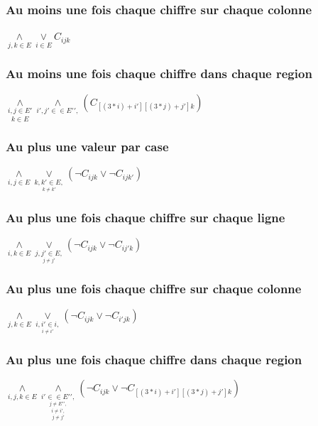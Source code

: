 \documentclass[12pt]{report}
\begin{document}
\subsubsection*{Au moins une fois chaque chiffre sur chaque colonne}
$\underset{j,k \in E}{\land} \underset{i \in E}{\lor} C_{ijk}$
\subsubsection*{Au moins une fois chaque chiffre dans chaque region}
$\underset{k \in E}{\underset{i,j \in E\prime}{\land}} \underset{i\prime,j\prime \in \in E\prime\prime,}{\land} (C_{[(3*i)+i\prime] [(3*j)+j\prime]k})$
\subsubsection*{Au plus une valeur par case}
$\underset{i,j \in E}{\land} \underset{\underset{k \ne k\prime}{k,k\prime \in E,} }{\lor} (\lnot C_{ijk} \lor \lnot C_{ijk\prime})$
\subsubsection*{Au plus une fois chaque chiffre sur chaque ligne}
$\underset{i,k \in E}{\land} \underset{\underset{j \ne j\prime}{j,j\prime \in E,}}{\lor} (\lnot C_{ijk} \lor \lnot C_{ij\prime k})$
\subsubsection*{Au plus une fois chaque chiffre sur chaque colonne}
$\underset{j,k \in E}{\land} \underset{\underset{i \ne i\prime}{i,i\prime \in i,}}{\lor} (\lnot C_{ijk} \lor \lnot C_{i\prime jk})$
\subsubsection*{Au plus une fois chaque chiffre dans chaque region}
$\underset{i,j,k \in E}{\land} \underset{\underset{j \neq j\prime}{\underset{i \neq i\prime,}{\underset{j \ne E\prime\prime,}{i\prime \in \in E\prime\prime,}}}}{\land} (\lnot C_{ijk} \lor \lnot C_{[(3*i)+i\prime] [(3*j)+j\prime]k})$
\end{document}
